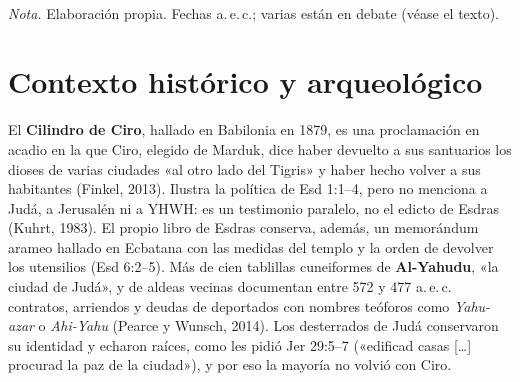 \documentclass[11pt,letterpaper]{article}
\begin{document}
\begin{center}
\\[2pt]
{\footnotesize\color{sepia}\textit{Nota.} Elaboración propia. Fechas a.\,e.\,c.; varias están en debate (véase el texto).}
\end{center}

\section{Contexto histórico y arqueológico}

El \textbf{Cilindro de Ciro}, hallado en Babilonia en 1879, es una proclamación en acadio en la que Ciro, elegido de Marduk, dice haber devuelto a sus santuarios los dioses de varias ciudades «al otro lado del Tigris» y haber hecho volver a sus habitantes (Finkel, 2013). Ilustra la política de Esd 1:1--4, pero no menciona a Judá, a Jerusalén ni a YHWH: es un testimonio paralelo, no el edicto de Esdras (Kuhrt, 1983). El propio libro de Esdras conserva, además, un memorándum arameo hallado en Ecbatana con las medidas del templo y la orden de devolver los utensilios (Esd 6:2--5). Más de cien tablillas cuneiformes de \textbf{Al-Yahudu}, «la ciudad de Judá», y de aldeas vecinas documentan entre 572 y 477 a.\,e.\,c. contratos, arriendos y deudas de deportados con nombres teóforos como \emph{Yahu-azar} o \emph{Ahi-Yahu} (Pearce y Wunsch, 2014). Los desterrados de Judá conservaron su identidad y echaron raíces, como les pidió Jer 29:5--7 («edificad casas [\ldots] procurad la paz de la ciudad»), y por eso la mayoría no volvió con Ciro.
\end{document}
